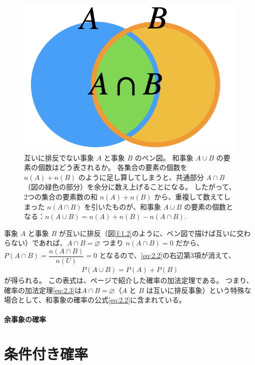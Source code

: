 \documentclass[12pt]{ltjsarticle}\usepackage{ifthen}\newcounter{enlarge}\setcounter{enlarge}{1}
\begin{document}
\begin{figure}[] 
\centering 
\includegraphics[width=6truecm]{./figure/f2-1.png}
\captionsetup{width=.9\linewidth}
\caption{%
  互いに排反でない事象 $A$ と事象 $B$ のベン図。
  和事象 $A \cup B$ の要素の個数はどう表されるか。
  各集合の要素の個数を $n(A) + n(B)$ のように足し算してしまうと、共通部分 $A \cap B$ （図の緑色の部分）を余分に数え上げることになる。
  したがって、2つの集合の要素数の和 $n(A) + n(B)$ から、重複して数えてしまった $n(A \cap B)$ を引いたものが、和事象 $A \cup B$ の要素の個数となる：$n(A \cup B) = n(A) + n(B) - n(A \cap B)$.
}
\label{f:2.1}
\end{figure}

事象 $A$ と事象 $B$ が互いに排反（図\ref{f:1.2}のように、ベン図で描けば互いに交わらない）であれば、$A \cap B = \varnothing$ つまり $ n(A \cap B) = 0$ だから、$P(A \cap B) = \dfrac{n(A \cap B)}{n(U)} = 0$ となるので、\eqref{eq:2.2}の右辺第3項が消えて、
\begin{align}
  P(A \cup B) = P(A) + P(B) \label{eq:2.3}
\end{align}
が得られる。
この表式は、\pageref{eq:1.19}ページで紹介した確率の加法定理である。
つまり、確率の加法定理\eqref{eq:2.3}は$A \cap B = \varnothing$（$A$ と $B$ は互いに排反事象）という特殊な場合として、和事象の確率の公式\eqref{eq:2.2}に含まれている。


\paragraph{余事象の確率}



\section{条件付き確率}
\end{document}
